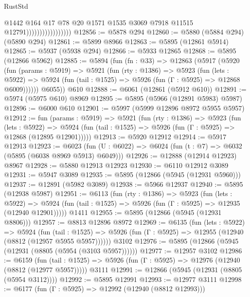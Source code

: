 \begin{lexlean}{RustStd}
\begin{coremodule}
{\begin{coremodule}
{{{{{{{{{{{{{{{{{{{{{{{{{{{{{{{{{{{                                      @1442
                                      @164
                                      @17
                                      @78
                                      @20
                                      @1571
                                      @1535
                                      @3069
                                      @7918
                                      @11515
                                      @12791)))))))))))))))))
@12856 := @5878 @294
@12860 := @5880 (@5884 @294) (@5890 @294)
@12861 := @5899 @8966
@12863 := @5895 (@12861 @5914)
@12865 := @5937 (@5938 @294)
@12866 := @5933 @12865
@12868 := @5895 (@12866 @5962)
@12885 := @5894
    (fun (fn : @33) =>
    @12863
      (@5917
        (@5920
          (fun (params : @5919) =>
          @5921
            (fun (rty : @1386) =>
            @5923
              (fun (lets : @5922) =>
              @5924 (fun (tail : @1525) => @5926 (fun (Γ : @5925) => @12868 @6009))))))
        @6055))
    @610
@12888 := @6061 (@12861 (@5912 @610))
@12891 := @5974 (@5975 @610) @8969
@12895 := @5895 (@5966 (@12891 @5983) @5987)
@12896 := @6000 @610
@12901 := @5997 (@5999 @12896 @8972 @5955 @5957)
@12912 := fun (params : @5919) =>
  @5921
    (fun (rty : @1386) =>
    @5923
      (fun (lets : @5922) =>
      @5924 (fun (tail : @1525) => @5926 (fun (Γ : @5925) => @12868 (@12895 @12901)))))
@12913 := @5920 @12912
@12914 := @5917 @12913
@12923 := @6023 (fun (U : @6022) => @6024 (fun (t : @7) => @6032 (@5895 (@6038 @8969 @5913) @6049)))
@12926 := @12888 (@12914 @12923) @8967
@12928 := @5880 @12913 @12923
@12930 := @6110 @12912 @3089
@12931 := @5947 @3089
@12935 := @5895 (@12866 (@5945 (@12931 @5960)))
@12937 := @12891 (@5982 @3089)
@12938 := @5966 @12937
@12940 := @5895 (@12938 @5987)
@12951 := @6113
    (fun (rty : @1386) =>
    @5923
      (fun (lets : @5922) =>
      @5924 (fun (tail : @1525) => @5926 (fun (Γ : @5925) => @12935 (@12940 @12901)))))
    @1411
@12955 := @5895 (@12866 (@5945 (@12931 @8806)))
@12957 := @8813 @12896 @8972
@12969 := @6135
    (fun (lets : @5922) =>
    @5924
      (fun (tail : @1525) =>
      @5926 (fun (Γ : @5925) => @12955 (@12940 (@8812 (@12957 @5955 @5957))))))
    @3102
@12976 := @5895 (@12866 (@5945 (@12931 (@8805 (@5954 (@3103 @5957))))))
@12977 := @12957 @3102
@12986 := @6159
    (fun (tail : @1525) => @5926 (fun (Γ : @5925) => @12976 (@12940 (@8812 (@12977 @5957)))))
    @3111
@12991 := @12866 (@5945 (@12931 (@8805 (@5954 @3112))))
@12992 := @5895 @12991
@12993 := @12977 @3111
@12998 := @6177 (fun (Γ : @5925) => @12992 (@12940 (@8812 @12993)))
}}}}}}}}}}}}}}}}}}}}}}}}}}}}}}}}}}}
\end{coremodule}}
\end{coremodule}
\end{lexlean}
